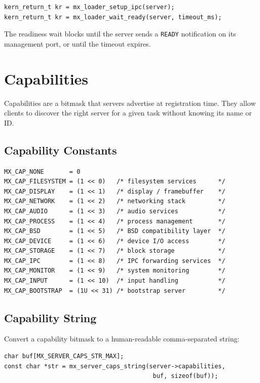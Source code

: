 \documentclass[a4paper,11pt]{article}
\begin{document}
\begin{lstlisting}
kern_return_t kr = mx_loader_setup_ipc(server);
kern_return_t kr = mx_loader_wait_ready(server, timeout_ms);
\end{lstlisting}

The readiness wait blocks until the server sends a \texttt{READY}
notification on its management port, or until the timeout expires.

\section{Capabilities}

Capabilities are a bitmask that servers advertise at registration
time. They allow clients to discover the right server for a given
task without knowing its name or ID.

\subsection{Capability Constants}

\begin{lstlisting}
MX_CAP_NONE       = 0
MX_CAP_FILESYSTEM = (1 << 0)   /* filesystem services      */
MX_CAP_DISPLAY    = (1 << 1)   /* display / framebuffer    */
MX_CAP_NETWORK    = (1 << 2)   /* networking stack         */
MX_CAP_AUDIO      = (1 << 3)   /* audio services           */
MX_CAP_PROCESS    = (1 << 4)   /* process management       */
MX_CAP_BSD        = (1 << 5)   /* BSD compatibility layer  */
MX_CAP_DEVICE     = (1 << 6)   /* device I/O access        */
MX_CAP_STORAGE    = (1 << 7)   /* block storage            */
MX_CAP_IPC        = (1 << 8)   /* IPC forwarding services  */
MX_CAP_MONITOR    = (1 << 9)   /* system monitoring        */
MX_CAP_INPUT      = (1 << 10)  /* input handling           */
MX_CAP_BOOTSTRAP  = (1U << 31) /* bootstrap server         */
\end{lstlisting}

\subsection{Capability String}

Convert a capability bitmask to a human-readable comma-separated
string:

\begin{lstlisting}
char buf[MX_SERVER_CAPS_STR_MAX];
const char *str = mx_server_caps_string(server->capabilities,
                                         buf, sizeof(buf));
\end{lstlisting}
\end{document}
